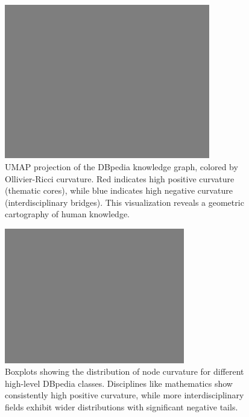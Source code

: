 \begin{figure}[h!]
    \centering
    \includegraphics[width=0.8\textwidth]{figures/placeholder.png}
    \caption{UMAP projection of the DBpedia knowledge graph, colored by Ollivier-Ricci curvature. Red indicates high positive curvature (thematic cores), while blue indicates high negative curvature (interdisciplinary bridges). This visualization reveals a geometric cartography of human knowledge.}
    \label{fig:dbpedia_curvature_full}
\end{figure}

\begin{figure}[h!]
    \centering
    \includegraphics[width=0.7\textwidth]{figures/placeholder.png}
    \caption{Boxplots showing the distribution of node curvature for different high-level DBpedia classes. Disciplines like mathematics show consistently high positive curvature, while more interdisciplinary fields exhibit wider distributions with significant negative tails.}
    \label{fig:dbpedia_boxplot}
\end{figure}


